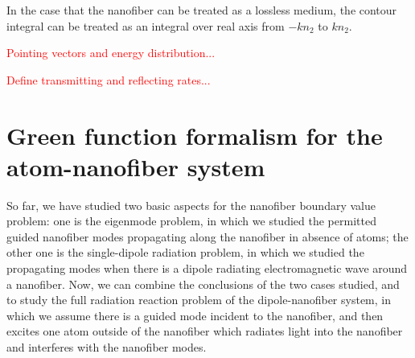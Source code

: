 \documentclass[]{report}
\begin{document}

In the case that the nanofiber can be treated as a lossless medium, the contour integral can be treated as an integral over real axis from $ -kn_2 $ to $ kn_2 $. 









\textcolor{red}{Pointing vectors and energy distribution...}

\textcolor{red}{Define transmitting and reflecting rates...}





\section{Green function formalism for the atom-nanofiber system}
So far, we have studied two basic aspects for the nanofiber boundary value problem: one is the eigenmode problem, in which we studied the permitted guided nanofiber modes propagating along the nanofiber in absence of atoms; the other one is the single-dipole radiation problem, in which we studied the propagating modes when there is a dipole radiating electromagnetic wave around a nanofiber. Now, we can combine the conclusions of the two cases studied, and to study the full radiation reaction problem of the dipole-nanofiber system, in which we assume there is a guided mode incident to the nanofiber, and then excites one atom outside of the nanofiber which radiates light into the nanofiber and interferes with the nanofiber modes. 
\end{document}
